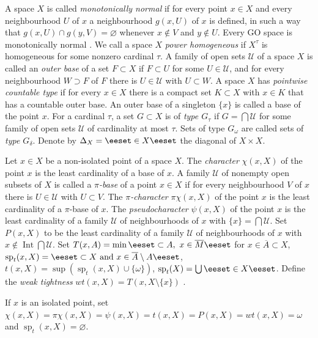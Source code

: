 \documentclass[preprint]{elsarticle}
\def\om{\omega}
\def\de{\delta}
\def\cl#1{\overline{#1}}
\def\Int{\operatorname{Int}}
\def\sp{\operatorname{sp}}
\def\es{\varnothing}
\def\sset#1{\{#1\}}
\def\set#1{\bbset#1\eeset}
\def\bbset#1:#2\eeset{\{#1\,:\,#2\}}
\def\cU{{\mathcal U}}
\def\D{\Delta}
\def\term#1{{\it #1}}
\theoremstyle{definition}
\theoremstyle{remark}
\begin{document}
A space $X$ is called \term{monotonically normal} if for every point $x\in X$ and every neighbourhood $U$ of $x$ a neighbourhood $g(x,U)$ of $x$ is defined, in such a way that $g(x,U)\cap g(y,V)=\es$ whenever $x\notin V$ and $y\notin U$. Every GO space is monotonically normal \cite[Theorem 5.21]{gru1984}. We call a space $X$ \term{power homogeneous} if $X^\tau$ is homogeneous for some nonzero cardinal $\tau$. A family of open sets $\cU$ of a space $X$ is called an \term{outer base} of a set $F\subset X$ if $F\subset U$ for some $U\in\cU$, and for every neighbourhood $W\supset F$ of $F$ there is $U\in\cU$ with $U\subset W$.
A space $X$ has \term{pointwise countable type} if for every $x\in X$ there is a compact set $K\subset X$ with $x \in K$ that has a countable outer base. An outer base of a singleton $\sset x$ is called a base of the point $x$.
For a cardinal $\tau$, a set $G\subset X$ is of \term{type $G_\tau$} if $G=\bigcap \cU$ for some family of open sets $\cU$ of cardinality at most $\tau$. Sets of type $G_\om$ are called sets of \term{type $G_\de$}.
Denote by $\D_X=\set{(x,x):x\in X}$ the diagonal of $X\times X$.

Let $x\in X$ be a non-isolated point of a space $X$.
The \term{character} $\chi(x,X)$ of the point $x$ is the least cardinality of a base of $x$.
A family $\cU$ of nonempty open subsets of $X$ is called a \term{$\pi$-base} of a point $x\in X$ if for every neighbourhood $V$ of $x$ there is $U\in\cU$ with $U\subset V$.
The \term{$\pi$-character} $\pi\chi(x,X)$ of the point $x$ is the least cardinality of a $\pi$-base of $x$.
The \term{pseudocharacter} $\psi(x,X)$ of the point $x$ is the least cardinality of a family $\cU$ of neighbourhoods of $x$ with $\sset x=\bigcap\cU$.
Set $P(x,X)$ \cite{JuhaszNyikosSzentmiklossy2005} to be the least cardinality of a family $\cU$ of neighbourhoods of $x$ with $x\notin\Int \bigcap\cU$.
%
Set $T(x,A)=\min\set{|M|: M\subset A,\ x\in\cl M}$ for $x\in \cl A\subset X$,
$\sp_t(x,X)=\set{T(x,A): A\subset X\text{ and }x\in \cl A \setminus A}$,
$t(x,X)=\sup (\sp_t(x,X)\cup\sset \om)$,  
$\sp_t(X)=\bigcup\set{\sp_t(x,X): x\in X}$. 
%
Define the \term{weak tightness} $wt(x,X)=T(x,X\setminus \sset x)$ \cite{WilliamsZhou1998}.

If $x$ is an isolated point, set $\chi(x,X)=\pi\chi(x,X)=\psi(x,X)=t(x,X)=P(x,X)=wt(x,X)=\om$ and $\sp_t(x,X)=\es$.
\end{document}
